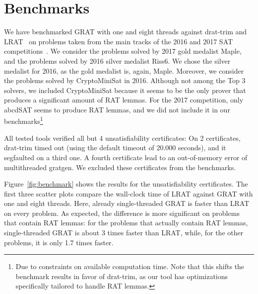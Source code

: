 \documentclass[smallcondensed]{svjour3}     %
\begin{document}
\section{Benchmarks}\label{sec:benchmarks}
  We have benchmarked GRAT with one and eight threads against drat-trim and LRAT~\cite{HHKW17} on problems taken from the main tracks of the 2016 and 2017 SAT 
  competitions~\cite{satcomp-2016,satcomp-2017}. We consider the problems solved by 2017 gold medalist Maple, and the problems solved by 2016 silver medalist Riss6.
  We chose the silver medalist for 2016, as the gold medalist is, again, Maple.
  Moreover, we consider the problems solved by CryptoMiniSat in 2016. Although not among the Top 3 solvers, we included CryptoMiniSat because it seems to be 
  the only prover that produces a significant amount of RAT lemmas. For the 2017 competition, only abcdSAT seems to produce RAT lemmas, and we did not include 
  it in our benchmarks\footnote{Due to constraints on available computation time. Note that this shifts the benchmark results in favor of drat-trim, 
    as our tool has optimizations specifically tailored to handle RAT lemmas.}
    
  All tested tools verified all but 4 unsatisfiability certificates: On 2 certificates, drat-trim timed out (using the default timeout of 20.000 seconds), 
  and it segfaulted on a third one. A fourth certificate lead to an out-of-memory error of multithreaded gratgen. We excluded these certificates 
  from the benchmarks.
    
  Figure~\ref{fig:benchmark} shows the results for the unsatisfiability certificates. The first three scatter plots compare the 
  wall-clock time of LRAT against GRAT with one and eight threads. Here, already single-threaded GRAT is faster than LRAT on every problem.
  As expected, the difference is more significant on problems that contain RAT lemmas: for the problems that actually contain RAT 
  lemmas, single-threaded GRAT is about 3 times faster than LRAT, while, for the other problems, it is only 1.7 times faster.
  
\end{document}
